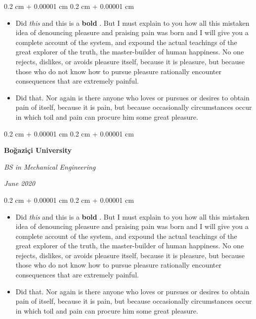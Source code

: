 \documentclass[10pt, letterpaper]{article}
\newenvironment{highlights}{
    \begin{itemize}[
        topsep=0.10 cm,
        parsep=0.10 cm,
        partopsep=0pt,
        itemsep=0pt,
        leftmargin=0.4 cm + 10pt
    ]
}{
    \end{itemize}
} %
\newenvironment{onecolentry}{
    \begin{adjustwidth}{
        0.2 cm + 0.00001 cm
    }{
        0.2 cm + 0.00001 cm
    }
}{
    \end{adjustwidth}
} %
\newenvironment{twocolentry}[2][]{
    \onecolentry
    \def\secondColumn{#2}
    \setcolumnwidth{\fill, 4.5 cm}
    \begin{paracol}{2}
}{
    \switchcolumn \raggedleft \secondColumn
    \end{paracol}
    \endonecolentry
} %
\let\hrefWithoutArrow\href
\renewcommand{\href}[2]{\hrefWithoutArrow{#1}{\ifthenelse{\equal{#2}{}}{ }{#2 }\raisebox{.15ex}{\footnotesize \faExternalLink*}}}
\begin{document}
        \vspace{0.10 cm}
        \begin{onecolentry}
            \begin{highlights}
                \item Did \textit{this} and this is a \textbf{bold} \href{https://example.com}{link}. But I must explain to you how all this mistaken idea of denouncing pleasure and praising pain was born and I will give you a complete account of the system, and expound the actual teachings of the great explorer of the truth, the master-builder of human happiness. No one rejects, dislikes, or avoids pleasure itself, because it is pleasure, but because those who do not know how to pursue pleasure rationally encounter consequences that are extremely painful.
                \item Did that. Nor again is there anyone who loves or pursues or desires to obtain pain of itself, because it is pain, but because occasionally circumstances occur in which toil and pain can procure him some great pleasure.
            \end{highlights}
        \end{onecolentry}


        \vspace{0.2 cm}

        \begin{twocolentry}{
            
            
        \textit{June 2020}}
            \textbf{Boğaziçi University}

            \textit{BS in Mechanical Engineering}
        \end{twocolentry}

        \vspace{0.10 cm}
        \begin{onecolentry}
            \begin{highlights}
                \item Did \textit{this} and this is a \textbf{bold} \href{https://example.com}{link}. But I must explain to you how all this mistaken idea of denouncing pleasure and praising pain was born and I will give you a complete account of the system, and expound the actual teachings of the great explorer of the truth, the master-builder of human happiness. No one rejects, dislikes, or avoids pleasure itself, because it is pleasure, but because those who do not know how to pursue pleasure rationally encounter consequences that are extremely painful.
                \item Did that. Nor again is there anyone who loves or pursues or desires to obtain pain of itself, because it is pain, but because occasionally circumstances occur in which toil and pain can procure him some great pleasure.
            \end{highlights}
        \end{onecolentry}
\end{document}
